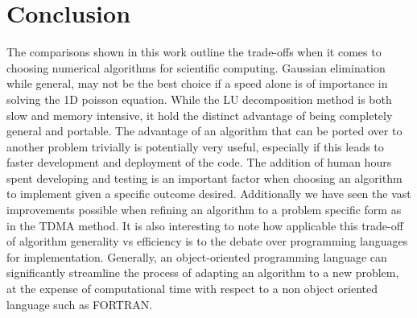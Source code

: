 \documentclass[10pt, a4paper]{amsart}
\begin{document}
\section{Conclusion}
The comparisons shown in this work outline the trade-offs when it comes to choosing numerical algorithms for scientific computing. Gaussian elimination while general, may not be the best choice if a speed alone is of importance in solving the 1D poisson equation. While the LU decomposition method is both slow and memory intensive, it hold the distinct advantage of being completely general and portable. The advantage of an algorithm that can be ported over to another problem trivially is potentially very useful, especially if this leads to faster development and deployment of the code. The addition of human hours spent developing and testing is an important factor when choosing an algorithm to implement given a specific outcome desired. Additionally we have seen the vast improvements possible when refining an algorithm to a problem specific form as in the TDMA method. It is also interesting to note how applicable this trade-off of algorithm generality vs efficiency is to the debate over programming languages for implementation. Generally, an object-oriented programming language can significantly streamline the process of adapting an algorithm to a new problem, at the expense of computational time with respect to a non object oriented language such as FORTRAN.



\end{document}

